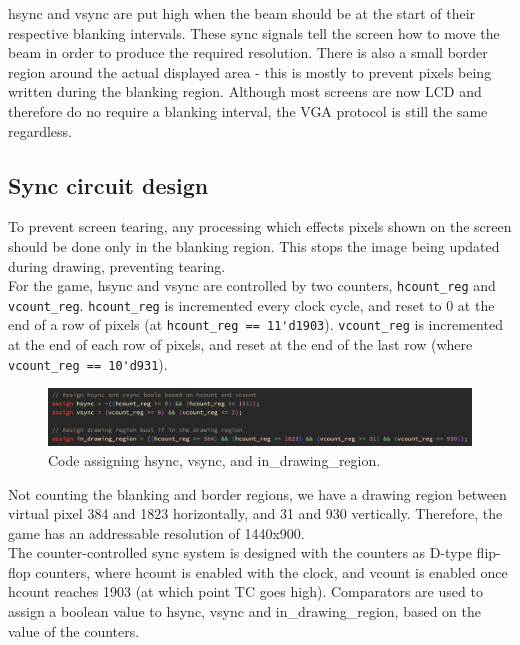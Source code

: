 \documentclass{ifda}
\begin{document}
hsync and vsync are put high when the beam should be at the start of their respective blanking intervals. These sync signals tell the screen how to move the beam in order to produce the required resolution. There is also a small border region around the actual displayed area - this is mostly to prevent pixels being written during the blanking region. Although most screens are now LCD and therefore do no require a blanking interval, the VGA protocol is still the same regardless.\\

\subsection{Sync circuit design}
To prevent screen tearing, any processing which effects pixels shown on the screen should be done only in the blanking region. This stops the image being updated during drawing, preventing tearing.\\

For the game, hsync and vsync are controlled by two counters, \verb|hcount_reg| and \\\verb|vcount_reg|. \verb|hcount_reg| is incremented every clock cycle, and reset to 0 at the end of a row of pixels (at \verb|hcount_reg == 11'd1903|). \verb|vcount_reg| is incremented at the end of each row of pixels, and reset at the end of the last row (where \verb|vcount_reg == 10'd931|).\\

\begin{figure}[h]
    \centering
    \includegraphics[width=1\textwidth]{ sync }
    \caption{Code assigning hsync, vsync, and in\_drawing\_region.}
    \label{fig:sync_assignment}
\end{figure}

Not counting the blanking and border regions, we have a drawing region between virtual pixel 384 and 1823 horizontally, and 31 and 930 vertically. Therefore, the game has an addressable resolution of 1440x900.\\

The counter-controlled sync system is designed with the counters as D-type flip-flop counters, where hcount is enabled with the clock, and vcount is enabled once hcount reaches 1903 (at which point TC goes high). Comparators are used to assign a boolean value to hsync, vsync and in\_drawing\_region, based on the value of the counters.\\
\end{document}
